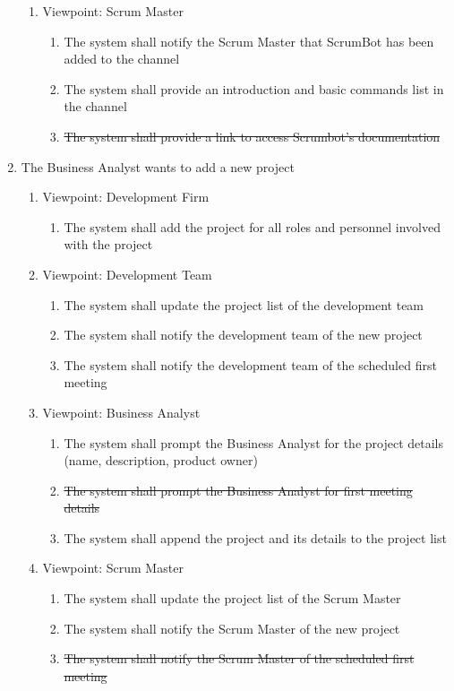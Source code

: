 \documentclass[12pt, titlepage]{article}
\begin{document}
\begin{enumerate}[{BE}1.]
\begin{enumerate}[{VP}1.]
        \item Viewpoint: Scrum Master
            \begin{enumerate}
                \item The system shall notify the Scrum Master that ScrumBot has been added to the channel
                \item The system shall provide an introduction and basic commands list in the channel
                \item \sout{The system shall provide a link to access Scrumbot's documentation}
            \end{enumerate}
    \end{enumerate}

	\item The Business Analyst wants to add a new project
	\begin{enumerate}[{VP}1.] 
	    \item Viewpoint: Development Firm
	        \begin{enumerate}
	            \item The system shall add the project for all roles and personnel involved with the project
	        \end{enumerate}
	    \item Viewpoint: Development Team
	        \begin{enumerate}
	            \item The system shall update the project list of the development team
	            \item The system shall notify the development team of the new project
	            \item The system shall notify the development team of the scheduled first meeting
	        \end{enumerate}
		\item Viewpoint: Business Analyst
			\begin{enumerate}
			    \item The system shall prompt the Business Analyst for the project details (name, description, product owner)
			    \item \sout{The system shall prompt the Business Analyst for first meeting details}
			    \item The system shall append the project and its details to the project list
			\end{enumerate}
		\item Viewpoint: Scrum Master
			\begin{enumerate}
			    \item The system shall update the project list of the Scrum Master
			    \item The system shall notify the Scrum Master of the new project
			    \item \sout{The system shall notify the Scrum Master of the scheduled first meeting}
			\end{enumerate}
	\end{enumerate}


\end{enumerate}
\end{document}
